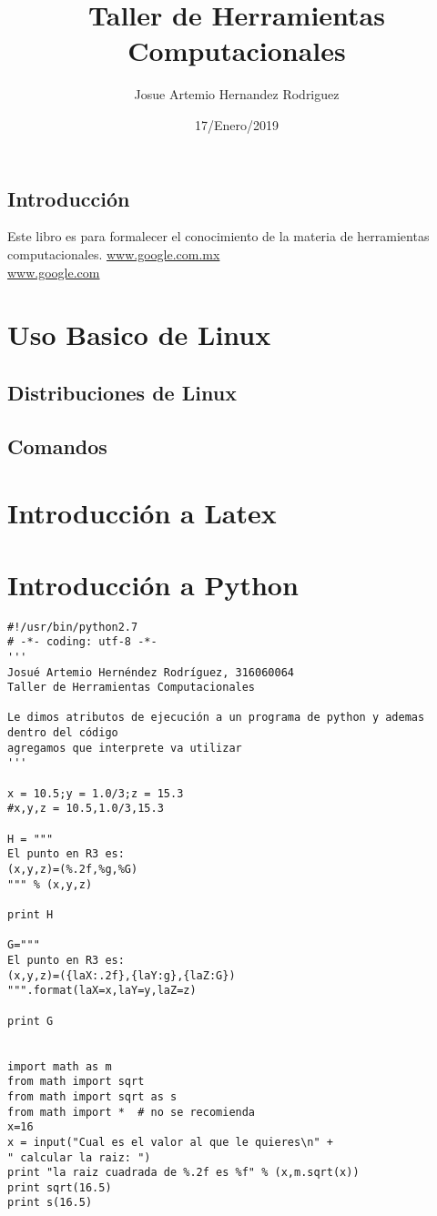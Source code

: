 \documentclass{book}
\title{Taller de Herramientas Computacionales}
\author{Josue Artemio Hernandez Rodriguez}
\date{17/Enero/2019}
\begin{document}
\maketitle
\tableofcontents
\section*{Introducción} Este libro es para formalecer el conocimiento de la materia de herramientas computacionales.
\url{www.google.com.mx}\\
\hyperref[Google]{www.google.com}

\chapter{Uso Basico de Linux}
\section{Distribuciones de Linux}
\section{Comandos}
\chapter{Introducción a Latex}
\chapter{Introducción a Python}

\begin{verbatim}
#!/usr/bin/python2.7 
# -*- coding: utf-8 -*-
'''
Josué Artemio Hernéndez Rodríguez, 316060064
Taller de Herramientas Computacionales

Le dimos atributos de ejecución a un programa de python y ademas dentro del código
agregamos que interprete va utilizar
'''

x = 10.5;y = 1.0/3;z = 15.3
#x,y,z = 10.5,1.0/3,15.3

H = """
El punto en R3 es:
(x,y,z)=(%.2f,%g,%G)
""" % (x,y,z)

print H

G="""
El punto en R3 es:
(x,y,z)=({laX:.2f},{laY:g},{laZ:G})
""".format(laX=x,laY=y,laZ=z)

print G


import math as m
from math import sqrt
from math import sqrt as s
from math import *  # no se recomienda
x=16
x = input("Cual es el valor al que le quieres\n" +
" calcular la raiz: ")
print "la raiz cuadrada de %.2f es %f" % (x,m.sqrt(x))
print sqrt(16.5)
print s(16.5)
\end{verbatim}
\end{document}
